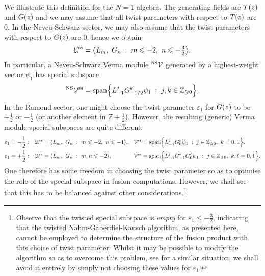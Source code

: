 \documentclass[a4paper,reqno,12pt]{report}
\theoremstyle{definition}
\numberwithin{equation}{section}
\let\originalleft\left     %
\let\originalright\right
\renewcommand{\left}{\mathopen{}\mathclose\bgroup\originalleft}
\renewcommand{\right}{\aftergroup\egroup\originalright}
\newcommand{\alg}[1]{\mathfrak{#1}} %
\newcommand{\func}[2]{#1 \left( #2 \right)} %
\newcommand{\set}[1]{\left\{ #1 \right\}}
\newcommand{\st}{\mspace{5mu} : \mspace{5mu}} %
\newcommand{\ZZ}{\mathbb{Z}}
\newcommand{\Ver}[1]{\mathcal{V}_{#1}}       %
\newcommand{\spsub}[1]{#1^{\text{ss}}}       %
\newcommand{\hw}{highest-weight}
\newcommand{\NGK}{Nahm-Gaberdiel-Kausch}
\newcommand{\ns}{Neveu-Schwarz}
\newcommand{\eps}{\varepsilon}
\DeclareMathOperator{\vspn}{span}
\renewcommand{\ge}{\geqslant}
\renewcommand{\le}{\leqslant}
\theoremstyle{plain}
\newcommand{\hwv}{\hw{} vector}
\newcommand{\NSVer}[1]{{}^{\text{NS}}\Ver{#1}}     %
\begin{document}
We illustrate this definition for the $N=1$ algebra.  The generating fields are $\func{T}{z}$ and $\func{G}{z}$ and we may assume that all twist parameters with respect to $\func{T}{z}$ are $0$.  In the \ns{} sector, we may also assume that the twist parameters with respect to $\func{G}{z}$ are $0$, hence we obtain
\begin{equation}
\spsub{\alg{U}} = \left\langle L_m, \ G_n \st m \le -2, \ n \le -\tfrac{3}{2} \right\rangle.
\end{equation}
In particular, a \ns{} Verma module $\NSVer{}$ generated by a \hwv{} $\psi_1$ has special subspace
\begin{equation}
\spsub{\NSVer{}} = \vspn \set{L_{-1}^j G_{-1/2}^k \psi_1 \st j,k \in \ZZ_{\ge 0}}.
\end{equation}
In the Ramond sector, one might choose the twist parameter $\eps_1$ for $\func{G}{z}$ to be $+\frac{1}{2}$ or $-\frac{1}{2}$ (or another element in $\ZZ + \frac{1}{2}$).  However, the resulting (generic) Verma module special subspaces are quite different:
\begin{equation} \label{eq:VermaSS}
\begin{aligned}
\eps_1 &= -\frac{1}{2}: & \spsub{\alg{U}} &= \left\langle L_m, \ G_n \st m \le -2, \ n \le -1 \right\rangle, & \spsub{\Ver{}} &= \vspn \set{L_{-1}^j G_0^k \psi_1 \st j \in \ZZ_{\ge 0}, \ k=0,1}. \\
\eps_1 &= +\frac{1}{2}: & \spsub{\alg{U}} &= \left\langle L_m, \ G_n \st m,n \le -2 \right\rangle, & \spsub{\Ver{}} &= \vspn \set{L_{-1}^j G_{-1}^k G_0^{\ell} \psi_1 \st j \in \ZZ_{\ge 0}, \ k,\ell=0,1}.
\end{aligned}
\end{equation}
One therefore has some freedom in choosing the twist parameter so as to optimise the role of the special subspace in fusion computations.  However, we shall see that this has to be balanced against other considerations.\footnote{Observe that the twisted special subspace is \emph{empty} for $\eps_1 \le -\frac{3}{2}$, indicating that the twisted \NGK{} algorithm, as presented here, cannot be employed to determine the structure of the fusion product with this choice of twist parameter.  Whilst it may be possible to modify the algorithm so as to overcome this problem, see \cite[Sec.~7]{RidBos14} for a similar situation, we shall avoid it entirely by simply not choosing these values for $\eps_1$.}
\end{document}
